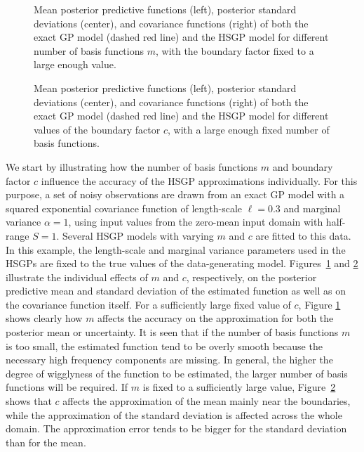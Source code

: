 \begin{figure} %
\centering
{}
\vspace{-1mm}
\caption{Mean posterior predictive functions (left), posterior standard deviations (center), and covariance functions (right) of both the exact GP model (dashed red line) and the HSGP model for different number of basis functions $m$, with the boundary factor fixed to a large enough value.}
  \label{fig1_Post_J}
\end{figure}

\begin{figure}
\centering
{}
\vspace{-1mm}
\caption{Mean posterior predictive functions (left), posterior standard deviations (center), and covariance functions (right) of both the exact GP model (dashed red line) and the HSGP model for different values of the boundary factor $c$, with a large enough fixed number of basis functions.}
  \label{fig2_Post_L}
\end{figure}

We start by illustrating how the number of basis functions $m$ and boundary factor $c$ influence the accuracy of the HSGP approximations individually. For this purpose, a set of noisy observations are drawn from an exact GP model with a squared exponential covariance function of length-scale $\ell=0.3$ and marginal variance $\alpha=1$, using input values from the zero-mean input domain with half-range $S=1$. Several HSGP models with varying $m$ and $c$ are fitted to this data. In this example, the length-scale and marginal variance parameters used in the HSGPs are fixed to the true values of the data-generating model. 
Figures~\ref{fig1_Post_J} and \ref{fig2_Post_L} illustrate the individual effects of $m$ and $c$, respectively, on the posterior predictive mean and standard deviation of the estimated function as well as on the covariance function itself. For a sufficiently large fixed value of $c$, Figure \ref{fig1_Post_J} shows clearly how $m$ affects the accuracy on the approximation for both the posterior mean or uncertainty. It is seen that if the number of basis functions $m$ is too small, the estimated function tend to be overly smooth because the necessary high frequency components are missing. In general, the higher the degree of wigglyness of the function to be estimated, the larger number of  basis functions will be required. If $m$ is fixed to a sufficiently large value, Figure~\ref{fig2_Post_L} shows that $c$ affects the approximation of the mean mainly near the boundaries, while the approximation of the standard deviation is affected across the whole domain. The approximation error tends to be bigger for the standard deviation than for the mean.

